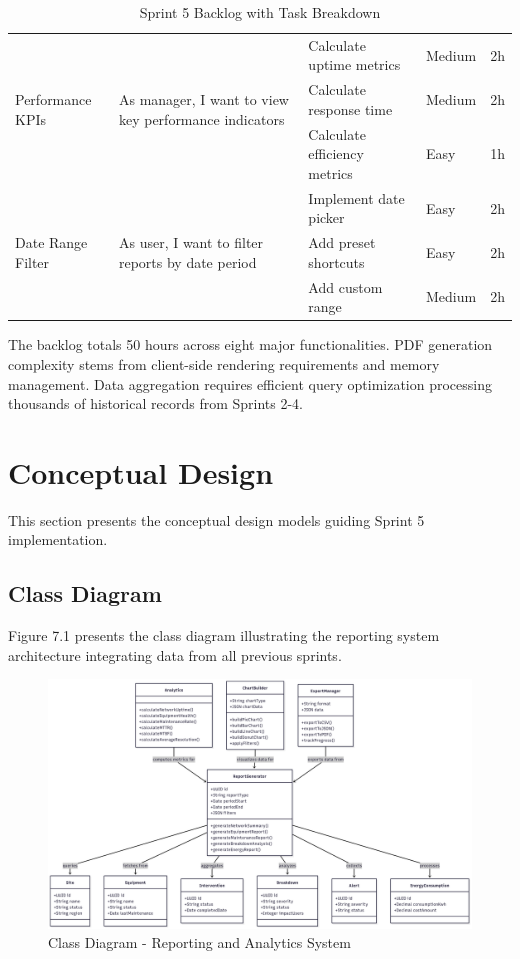 \begin{table}[H]
\begin{tabular}{|p{2.5cm}|p{4cm}|p{3.2cm}|p{2.2cm}|p{1.5cm}|}
\multirow{3}{2.5cm}{Performance KPIs} & 
\multirow{3}{4cm}{As manager, I want to view key performance indicators}
& Calculate uptime metrics & Medium & 2h \\
\cline{3-5}
& & Calculate response time & Medium & 2h \\
\cline{3-5}
& & Calculate efficiency metrics & Easy & 1h \\
\hline

\multirow{3}{2.5cm}{Date Range Filter} & 
\multirow{3}{4cm}{As user, I want to filter reports by date period}
& Implement date picker & Easy & 2h \\
\cline{3-5}
& & Add preset shortcuts & Easy & 2h \\
\cline{3-5}
& & Add custom range & Medium & 2h \\
\hline

\end{tabular}
\caption{Sprint 5 Backlog with Task Breakdown}
\label{tab:sprint5_backlog}
\end{table}

The backlog totals 50 hours across eight major functionalities. PDF generation complexity stems from client-side rendering requirements and memory management. Data aggregation requires efficient query optimization processing thousands of historical records from Sprints 2-4.

\section{Conceptual Design}

This section presents the conceptual design models guiding Sprint 5 implementation.

\subsection{Class Diagram}

Figure 7.1 presents the class diagram illustrating the reporting system architecture integrating data from all previous sprints.

\begin{figure}[H]
    \centering
    \includegraphics[width=0.95\linewidth]{img/chap_07/sprint5_class_diagram.png}
    \caption{Class Diagram - Reporting and Analytics System}
    \label{fig:class_diagram_sprint5}
\end{figure}

